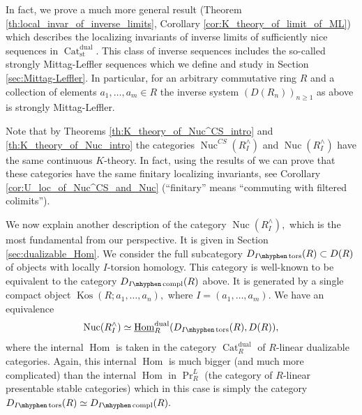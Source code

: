 \documentclass[11pt,leqno]{amsart}
\numberwithin{equation}{section}
\def\Hom{\operatorname{Hom}}
\newcommand{\hy}{\mhyphen}
\newcommand{\Nuc}{\operatorname{Nuc}}
\newcommand{\Cat}{\operatorname{Cat}}
\newcommand{\cont}{\operatorname{cont}}
\newcommand{\st}{\operatorname{st}}
\newcommand{\dual}{\operatorname{dual}}
\newcommand{\un}{\underline}
\newcommand{\Kos}{\operatorname{Kos}}
\newcommand{\Sp}{\operatorname{Sp}}
\newcommand{\tors}{\operatorname{tors}}
\newcommand{\compl}{\operatorname{compl}}
\begin{document}
In fact, we prove a much more general result (Theorem \ref{th:local_invar_of_inverse_limits}, Corollary \ref{cor:K_theory_of_limit_of_ML}) which describes the localizing invariants of inverse limits of sufficiently nice sequences in $\Cat_{\st}^{\dual}.$ This class of inverse sequences includes the so-called strongly Mittag-Leffler sequences which we define and study in Section \ref{sec:Mittag-Leffler}. In particular, for an arbitrary commutative ring $R$ and a collection of elements $a_1,\dots,a_m\in R$ the inverse system $(D(R_n))_{n\geq 1}$ as above is strongly Mittag-Leffler. 
 
Note that by Theorems \ref{th:K_theory_of_Nuc^CS_intro} and \ref{th:K_theory_of_Nuc_intro} the categories $\Nuc^{CS}(R^{\wedge}_I)$ and $\Nuc(R^{\wedge}_I)$ have the same continuous $K$-theory. In fact, using the results of \cite{Cor} we can prove that these categories have the same finitary localizing invariants, see Corollary \ref{cor:U_loc_of_Nuc^CS_and_Nuc} (``finitary'' means ``commuting with filtered colimits''). 

We now explain another description of the category $\Nuc(R^{\wedge}_I),$ which is the most fundamental from our perspective. It is given in Section \ref{sec:dualizable_Hom}. We consider the full subcategory $D_{I\hy\tors}(R)\subset D(R)$ of objects with locally $I$-torsion homology. This category is well-known to be equivalent to the category $D_{I\hy\compl}(R)$ above. It is generated by a single compact object $\Kos(R;a_1,\dots,a_n),$ where $I=(a_1,\dots,a_m).$ We have an equivalence
\begin{equation*}
\Nuc(R^{\wedge}_I)\simeq\un{\Hom}_R^{\dual}(D_{I\hy\tors}(R),D(R)),
\end{equation*}
where the internal $\Hom$ is taken in the category $\Cat_R^{\dual}$ of $R$-linear dualizable categories. Again, this internal $\Hom$ is much bigger (and much more complicated) than the internal $\Hom$ in $\Pr^L_R$ (the category of $R$-linear presentable stable categories) which in this case is simply the category $D_{I\hy\tors}(R)\simeq D_{I\hy\compl}(R).$ 
\end{document}
